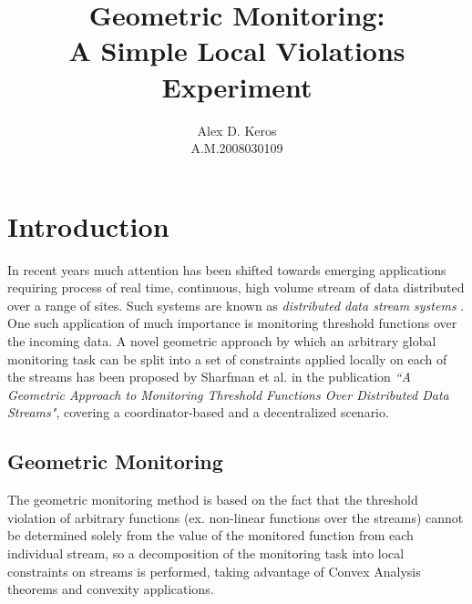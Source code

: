 \documentclass{article}
\begin{document}
	\title{Geometric Monitoring:\\
A Simple Local Violations Experiment}
	\author{Alex D. Keros\\
	A.M.2008030109}
	\date{}
	\maketitle	
	\thispagestyle{empty}	
	
	\newpage	
	\tableofcontents

	\newpage
	\section{Introduction}
	
		In recent years much attention has been shifted towards emerging applications requiring process of real time, continuous, high volume stream of data distributed over a range of sites. Such systems are known as \emph{distributed data stream systems} \cite{BabcockBabuDatarMotwaniWidom02}. One such application of much importance is monitoring threshold functions over the incoming data. A novel geometric approach by which an arbitrary global monitoring task can be split into a set of constraints applied locally on each of the streams has been proposed by Sharfman et al. in the publication \emph{``A Geometric Approach to Monitoring Threshold Functions Over Distributed Data Streams"}\cite{SharfmanSchusterKeren06}, covering a coordinator-based and a decentralized scenario.
		
		\subsection{Geometric Monitoring}\label{sub:GM} 

		
			The geometric monitoring method is based on the fact that the threshold violation of arbitrary functions (ex. non-linear functions over the streams) cannot be determined solely from the value of the monitored function from each individual stream, so a decomposition of the monitoring task into local constraints on streams is performed, taking advantage of Convex Analysis theorems and convexity applications.
	
\end{document}
